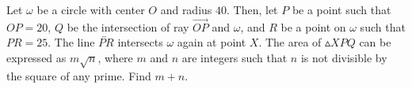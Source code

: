 Let  $\omega$ be a circle with center $O$ and radius $40$. Then, let $P$ be a point such that $OP = 20$, $Q$ be the intersection of ray $\overrightarrow{OP}$ and  $\omega$, and $R$ be a point on $\omega$ such that $PR = 25$. The line  $\overleftrightarrow{PR}$ intersects  $\omega$ again at point $X$. The area of $\vartriangle XPQ$ can be expressed as $m\sqrt{n}$, where $m$ and $n$ are integers such that $n$ is not divisible by the square of any prime. Find $m + n$.
